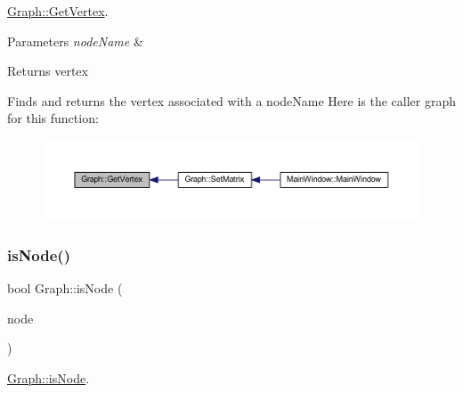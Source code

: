 \mbox{\hyperlink{class_graph_a7f7b9f3d4992166ce4b52a1ea7d9c816}{Graph\+::\+Get\+Vertex}}. 


\begin{DoxyParams}{Parameters}
{\em node\+Name} & \\
\hline
\end{DoxyParams}
\begin{DoxyReturn}{Returns}
vertex
\end{DoxyReturn}
Finds and returns the vertex associated with a node\+Name Here is the caller graph for this function\+:
\nopagebreak
\begin{figure}[H]
\begin{center}
\leavevmode
\includegraphics[width=350pt]{class_graph_a7f7b9f3d4992166ce4b52a1ea7d9c816_icgraph}
\end{center}
\end{figure}
\mbox{\label{class_graph_a981460a9962c0cccada8459347a5fd5d}} 
\subsubsection{\texorpdfstring{is\+Node()}{isNode()}}
{\footnotesize\ttfamily bool Graph\+::is\+Node (\begin{DoxyParamCaption}\item[{Q\+String}]{node }\end{DoxyParamCaption})}



\mbox{\hyperlink{class_graph_a981460a9962c0cccada8459347a5fd5d}{Graph\+::is\+Node}}. 


